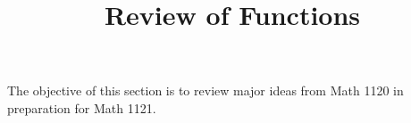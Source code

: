 \documentclass{ximera}
\author{}
\title{Review of Functions}
\begin{document}
\begin{abstract}
\end{abstract}
\maketitle


\begin{objectives}
\item The objective of this section is to review major ideas from Math 1120 in preparation for Math 1121.
\end{objectives}
\end{document}
